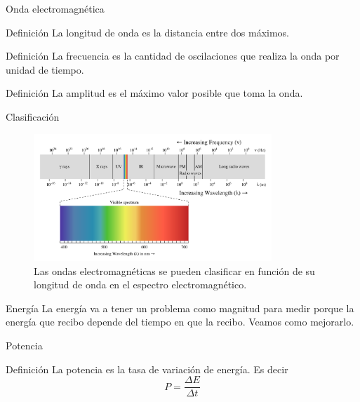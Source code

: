 \documentclass[]{beamer}
\begin{document}
\begin{frame}{Onda electromagnética}
  \begin{block}{Definición}
    La longitud de onda es la distancia entre dos máximos.
  \end{block}\pause
  \begin{block}{Definición}
    La frecuencia es la cantidad de oscilaciones que realiza la onda por unidad de tiempo.
  \end{block}\pause
  \begin{block}{Definición}
    La amplitud es el máximo valor posible que toma la onda.
  \end{block}
\end{frame}

\begin{frame}{Clasificación}
  \begin{figure}
    \includegraphics[width=0.8\textwidth]{imagenes/espectrum.png}
    \caption{Las ondas electromagnéticas se pueden clasificar en función de su longitud de onda en el espectro electromagnético. }
  \end{figure}
\end{frame}

\begin{frame}{Energía}
  La energía va a tener un problema como magnitud para medir porque la energía que recibo depende del tiempo en que la recibo. Veamos como mejorarlo.
\end{frame}

\begin{frame}{Potencia}
  \begin{block}{Definición}
    La potencia es la tasa de variación de energía. Es decir
    \begin{equation}
      P = \frac{\Delta E}{\Delta t}
    \end{equation}
  \end{block}
\end{frame}
\end{document}
